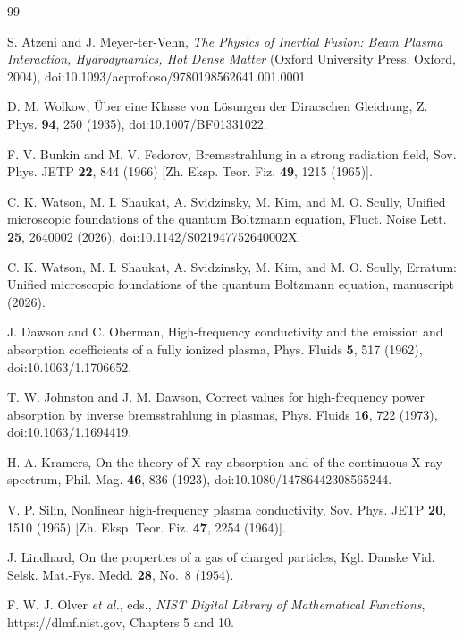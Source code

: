 \documentclass[11pt]{article}
\numberwithin{equation}{section}
\begin{document}
\begin{thebibliography}{99}

 S. Atzeni and J. Meyer-ter-Vehn, \emph{The Physics of
Inertial Fusion: Beam Plasma Interaction, Hydrodynamics, Hot Dense Matter}
(Oxford University Press, Oxford, 2004), doi:10.1093/acprof:oso/9780198562641.001.0001.

 D. M. Wolkow, \"Uber eine Klasse von L\"osungen der
Diracschen Gleichung, Z. Phys. \textbf{94}, 250 (1935), doi:10.1007/BF01331022.

 F. V. Bunkin and M. V. Fedorov, Bremsstrahlung in a
strong radiation field, Sov. Phys. JETP \textbf{22}, 844 (1966) [Zh. Eksp. Teor.
Fiz. \textbf{49}, 1215 (1965)].

 C. K. Watson, M. I. Shaukat, A. Svidzinsky, M. Kim, and M. O.
Scully, Unified microscopic foundations of the quantum Boltzmann equation,
Fluct. Noise Lett. \textbf{25}, 2640002 (2026), doi:10.1142/S021947752640002X.

 C. K. Watson, M. I. Shaukat, A. Svidzinsky, M. Kim,
and M. O. Scully, Erratum: Unified microscopic foundations of the quantum
Boltzmann equation, manuscript (2026).

 J. Dawson and C. Oberman, High-frequency
conductivity and the emission and absorption coefficients of a fully ionized
plasma, Phys. Fluids \textbf{5}, 517 (1962), doi:10.1063/1.1706652.

 T. W. Johnston and J. M. Dawson, Correct values for
high-frequency power absorption by inverse bremsstrahlung in plasmas, Phys.
Fluids \textbf{16}, 722 (1973), doi:10.1063/1.1694419.

 H. A. Kramers, On the theory of X-ray absorption and of
the continuous X-ray spectrum, Phil. Mag. \textbf{46}, 836 (1923),
doi:10.1080/14786442308565244.

 V. P. Silin, Nonlinear high-frequency plasma conductivity,
Sov. Phys. JETP \textbf{20}, 1510 (1965) [Zh. Eksp. Teor. Fiz. \textbf{47}, 2254
(1964)].

 J. Lindhard, On the properties of a gas of charged
particles, Kgl. Danske Vid. Selsk. Mat.-Fys. Medd. \textbf{28}, No.~8 (1954).

 F. W. J. Olver \emph{et al.}, eds., \emph{NIST Digital Library of
Mathematical Functions}, https://dlmf.nist.gov, Chapters 5 and 10.


\end{thebibliography}
\end{document}
